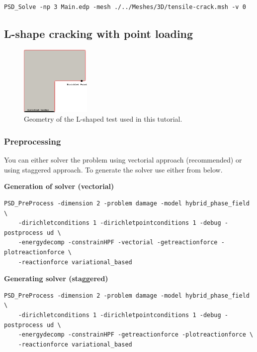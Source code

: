 {{\begin{lstlisting}[style=BashInputStyle]
	PSD_Solve -np 3 Main.edp -mesh ./../Meshes/3D/tensile-crack.msh -v 0
\end{lstlisting}



\subsection{L-shape cracking with point loading}
\begin{figure}[h!]
	\centering
	\includegraphics[width=0.3\textwidth]{./Images/fm-geometry.png}
	\caption{Geometry of the L-shaped test used in this tutorial. \label{L-shape-geo}}
\end{figure}

\subsubsection{Preprocessing}

You can either solver the problem using vectorial approach (recommended) or using staggered approach. To generate the solver use either from below.

\textbf{Generation of solver (vectorial)}

\begin{lstlisting}[style=BashInputStyle]
	PSD_PreProcess -dimension 2 -problem damage -model hybrid_phase_field \
	-dirichletconditions 1 -dirichletpointconditions 1 -debug -postprocess ud \
	-energydecomp -constrainHPF -vectorial -getreactionforce -plotreactionforce \
	-reactionforce variational_based
\end{lstlisting}

\textbf{Generating solver (staggered)}

\begin{lstlisting}[style=BashInputStyle]
	PSD_PreProcess -dimension 2 -problem damage -model hybrid_phase_field \
	-dirichletconditions 1 -dirichletpointconditions 1 -debug -postprocess ud \
	-energydecomp -constrainHPF -getreactionforce -plotreactionforce \
	-reactionforce variational_based
\end{lstlisting}


}}
